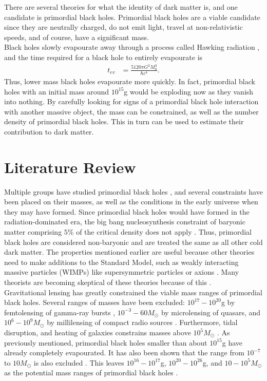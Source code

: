 There are several theories for what the identity of dark matter is, and one candidate is primordial black holes. Primordial black holes are a viable candidate since they are neutrally charged, do not emit light, travel at non-relativistic speeds, and of course, have a significant mass. \\

Black holes slowly evapourate away through a process called Hawking radiation \cite{hawking}, and the time required for a black hole to entirely evapourate is 
\begin{align*}
t_{ev} &= \frac{5120 \pi G^2 M_0^3}{\hbar c^4}.
\end{align*}
Thus, lower mass black holes evapourate more quickly. In fact, primordial black holes with an initial mass around $10^{15}$g would be exploding now as they vanish into nothing. By carefully looking for signs of a primordial black hole interaction with another massive object, the mass can be constrained, as well as the number density of primordial black holes. This in turn can be used to estimate their contribution to dark matter.

\section{Literature Review}

Multiple groups have studied primordial black holes \cite{bigpaper}, and several constraints have been placed on their masses, as well as the conditions in the early universe when they may have formed. Since primordial black holes would have formed in the radiation-dominated era, the big bang nucleosynthesis constraint of baryonic matter comprising $5\%$ of the critical density does not apply \cite{critdens, cosmology}. Thus, primordial black holes are considered non-baryonic and are treated the same as all other cold dark matter. The properties mentioned earlier are useful because other theories need to make additions to the Standard Model, such as weakly interacting massive particles (WIMPs) like supersymmetric particles or axions \cite{supersym}. Many theorists are becoming skeptical of these theories because of this \cite{pessimism}. \\

Gravitational lensing has greatly constrained the viable mass ranges of primordial black holes. Several ranges of masses have been excluded: $10^{17}-10^{20}$g by femtolensing of gamma-ray bursts \cite{massfemt}, $10^{-3}-60 M_\odot$ by microlensing of quasars, and $10^6-10^9 M_\odot$ by millilensing of compact radio sources \cite{massmilli}. Furthermore, tidal disruption, and heating of galaxies constrains masses above $10^5 M_\odot$ \cite{massheavy}. As previously mentioned, primordial black holes smaller than about $10^{15}$g have already completely evapourated. It has also been shown that the range from $10^{-7}$ to $10 M_\odot$ is also excluded \cite{mass1}. This leaves $10^{16}-10^{17}$g, $10^{20}-10^{26}$g, and $10-10^{5}M_\odot$ as the potential mass ranges of primordial black holes \cite{massrange}. \\

